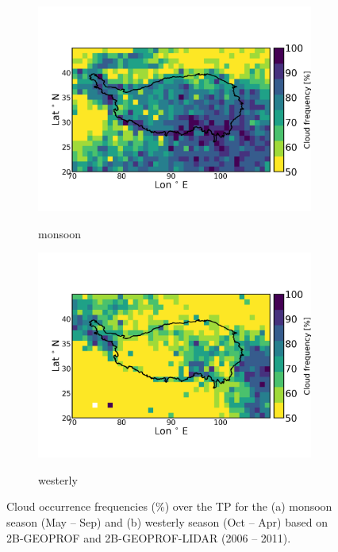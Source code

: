 \documentclass[alpha-refs]{wiley-article}
\begin{document}
\begin{figure}[!htbp]
\centering
    \begin{subfigure}[b]{0.5\textwidth}
       \centering
        \caption{monsoon}       
        \includegraphics[width=\textwidth]{cloudfreq_monsoonseason.png}
        \label{fig:cloud_occ1}
    \end{subfigure}%
    \begin{subfigure}[b]{0.5\textwidth}
        \centering
        \caption{westerly} 
        \includegraphics[width=\textwidth]{cloudfreq_westerlyseason.png}
         \label{fig:cloud_occ2}
    \end{subfigure}   
    \caption{Cloud occurrence frequencies (\%) over the TP for the (a) monsoon season (May -- Sep) and (b) westerly season (Oct -- Apr) based on 2B-GEOPROF and 2B-GEOPROF-LIDAR (2006 – 2011).}
    \label{fig:cloud_occ}
\end{figure}
\end{document}
